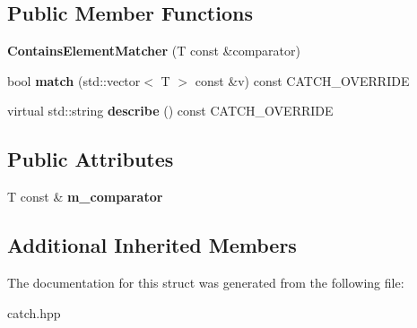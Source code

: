 \subsection*{Public Member Functions}
\begin{DoxyCompactItemize}
\item 
\mbox{\label{structCatch_1_1Matchers_1_1Vector_1_1ContainsElementMatcher_a6a05740b5d3f89fac8de84ac0cff7b93}} 
{\bfseries Contains\+Element\+Matcher} (T const \&comparator)
\item 
\mbox{\label{structCatch_1_1Matchers_1_1Vector_1_1ContainsElementMatcher_a95fd99879bcfbe129898bef922c92c17}} 
bool {\bfseries match} (std\+::vector$<$ T $>$ const \&v) const C\+A\+T\+C\+H\+\_\+\+O\+V\+E\+R\+R\+I\+DE
\item 
\mbox{\label{structCatch_1_1Matchers_1_1Vector_1_1ContainsElementMatcher_a5a869772714dd045816707b74b217664}} 
virtual std\+::string {\bfseries describe} () const C\+A\+T\+C\+H\+\_\+\+O\+V\+E\+R\+R\+I\+DE
\end{DoxyCompactItemize}
\subsection*{Public Attributes}
\begin{DoxyCompactItemize}
\item 
\mbox{\label{structCatch_1_1Matchers_1_1Vector_1_1ContainsElementMatcher_ab7eada6c4bbce1d21b44773262f9cb23}} 
T const  \& {\bfseries m\+\_\+comparator}
\end{DoxyCompactItemize}
\subsection*{Additional Inherited Members}


The documentation for this struct was generated from the following file\+:\begin{DoxyCompactItemize}
\item 
catch.\+hpp\end{DoxyCompactItemize}
